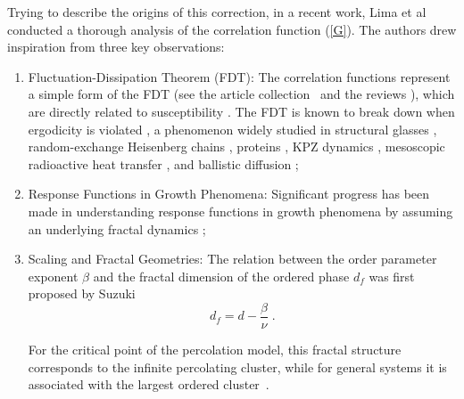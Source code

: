 \documentclass[pre,aps,twocolumn,showpacs,floatfix,nofootinbib,superscriptaddress,linenumbers]{revtex4-1}
\begin{document}
Trying to describe the origins of this correction, in a recent work, Lima et al~\cite{Lima24} conducted a thorough analysis of the correlation function (\ref{G}). The authors drew inspiration from three key observations: 
\begin{enumerate}
\item Fluctuation-Dissipation Theorem (FDT): The correlation functions represent a simple form of the FDT (see the article collection~\cite{Nowak22} and the  reviews \cite{Oliveira19,GomesFilho25}), which are directly related to susceptibility \cite{Goldenfeld18}. The FDT is known to break down when ergodicity is violated \cite{Costa03,Wen23}, a phenomenon widely studied in structural glasses \cite{Grigera99,Ricci-Tersenghi00,Crisanti03,Barrat98,Bellon02,Bellon06}, random-exchange Heisenberg chains \cite{Vainstein05}, proteins \cite{Hayashi07}, KPZ dynamics \cite{Kardar86,Rodriguez19}, mesoscopic radioactive heat transfer \cite{Perez-Madrid09,Averin10}, and ballistic diffusion \cite{Costa03,Costa06};
\item Response Functions in Growth Phenomena: Significant progress has been made in understanding response functions in growth phenomena by assuming an underlying fractal dynamics \cite{Barabasi95,Feder22, GomesFilho21b,Anjos21,Luis22,Luis23,GomesFilho24};
\item  Scaling and Fractal Geometries:  The relation between the order parameter exponent $\beta$ and
the fractal dimension of the ordered phase $d_f$ was first proposed by Suzuki \cite{Suzuki8}
\begin{equation}
\label{dl}
d_f=d-\frac{\beta}{\nu}\;.
\end{equation}

For the critical point of the percolation model, this fractal structure corresponds to the infinite percolating cluster\cite{Grimmett06,Cruz23}, while for general systems it is associated with the largest ordered cluster~\cite{Kroger00}. 
\end{enumerate}
\end{document}
